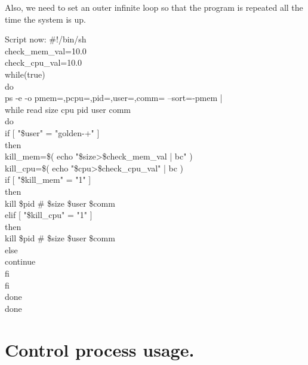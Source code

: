 \documentclass[12pt,a4paper]{article}
\begin{document}
Also, we need to set an outer infinite loop so that the program is repeated all the time the system is up.\\
\begin{flushleft}
Script now:
\newline
\#!/bin/sh\\
check\_mem\_val=10.0\\
check\_cpu\_val=10.0\\
while(true)\\
do\\
ps -e -o pmem=,pcpu=,pid=,user=,comm= --sort=-pmem |\\
  while read size cpu pid user comm\\
  do\\
if [ "\$user" = "golden-+" ]\\
    then\\
kill\_mem=\$( echo "\$size>\$check\_mem\_val | bc" )\\
kill\_cpu=\$( echo "\$cpu>\$check\_cpu\_val" | bc )\\
 if [ "\$kill\_mem" = "1" ]\\
      then\\
        kill \$pid \# \$size \$user \$comm\\
      elif [ "\$kill\_cpu" = "1" ]\\
      then\\
        kill \$pid \# \$size \$user \$comm\\
      else\\
        continue\\
      fi\\
fi\\
  done\\
done\\
\end{flushleft}
\newpage
\section{Control process usage.}
\end{document}

